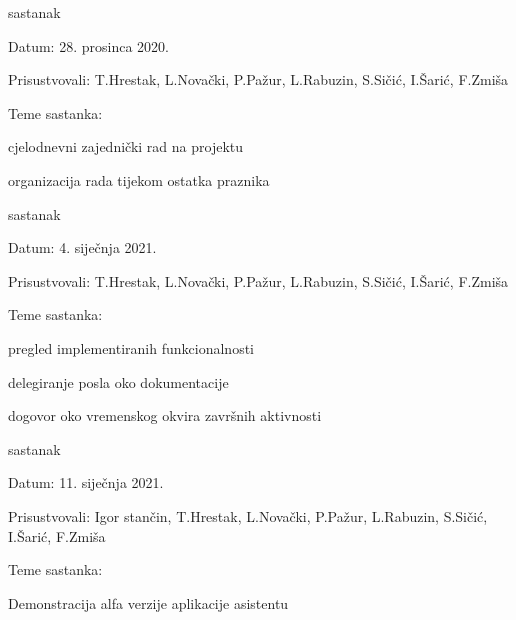 \begin{packed_enum}
	\item  sastanak
	
	\item[] \begin{packed_item}
		\item Datum: 28. prosinca 2020.
		\item Prisustvovali: T.Hrestak, L.Novački, P.Pažur, L.Rabuzin, S.Sičić, I.Šarić, F.Zmiša
		\item Teme sastanka:
		\begin{packed_item}
			\item  cjelodnevni zajednički rad na projektu
			\item  organizacija rada tijekom ostatka praznika
		\end{packed_item}
	\end{packed_item}
	
	\item  sastanak
	
	\item[] \begin{packed_item}
		\item Datum: 4. siječnja 2021.
		\item Prisustvovali: T.Hrestak, L.Novački, P.Pažur, L.Rabuzin, S.Sičić, I.Šarić, F.Zmiša
		\item Teme sastanka:
		\begin{packed_item}
			\item  pregled implementiranih funkcionalnosti
			\item  delegiranje posla oko dokumentacije
			\item  dogovor oko vremenskog okvira završnih aktivnosti
		\end{packed_item}
	\end{packed_item}
	
	\item  sastanak
	
	\item[] \begin{packed_item}
		\item Datum: 11. siječnja 2021.
		\item Prisustvovali: Igor stančin, T.Hrestak, L.Novački, P.Pažur, L.Rabuzin, S.Sičić, I.Šarić, F.Zmiša
		\item Teme sastanka:
		\begin{packed_item}
			\item  Demonstracija alfa verzije aplikacije asistentu
		\end{packed_item}
	\end{packed_item}
	

\end{packed_enum}
